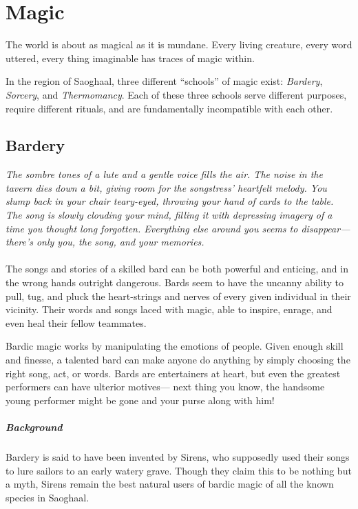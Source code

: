 \chapter{Magic}
The world is about as magical as it is mundane.
Every living creature, every word uttered, every thing imaginable has traces of magic within.

In the region of Saoghaal, three different ``schools'' of magic exist: \textit{Bardery}, \textit{Sorcery}, and \textit{Thermomancy}.
Each of these three schools serve different purposes, require different rituals, and are fundamentally incompatible with each other.

\section{Bardery}
\textit{The sombre tones of a lute and a gentle voice fills the air.
The noise in the tavern dies down a bit, giving room for the songstress' heartfelt melody.
You slump back in your chair teary-eyed, throwing your hand of cards to the table.
The song is slowly clouding your mind, filling it with depressing imagery of a time you thought long forgotten.
Everything else around you seems to disappear---there's only you, the song, and your memories.}\\\\
The songs and stories of a skilled bard can be both powerful and enticing, and in the wrong hands outright dangerous.
Bards seem to have the uncanny ability to pull, tug, and pluck the heart-strings and nerves of every given individual in their vicinity.
Their words and songs laced with magic, able to inspire, enrage, and even heal their fellow teammates.

Bardic magic works by manipulating the emotions of people. 
Given enough skill and finesse, a talented bard can make anyone do anything by simply choosing the right song, act, or words.
Bards are entertainers at heart, but even the greatest performers can have ulterior motives---
next thing you know, the handsome young performer might be gone and your purse along with him!

\paragraph{Background} Bardery is said to have been invented by Sirens, who supposedly used their songs to lure sailors to an early watery grave.
Though they claim this to be nothing but a myth, Sirens remain the best natural users of bardic magic of all the known species in Saoghaal.

